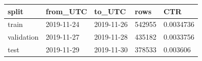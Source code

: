 \begin{tabular}{lllll}
\hline
split & from\_UTC & to\_UTC & rows & CTR \\
\hline
train & 2019-11-24 & 2019-11-26 & 542955 & 0.0034736 \\
validation & 2019-11-27 & 2019-11-28 & 435182 & 0.0033756 \\
test & 2019-11-29 & 2019-11-30 & 378533 & 0.003606 \\
\hline
\end{tabular}